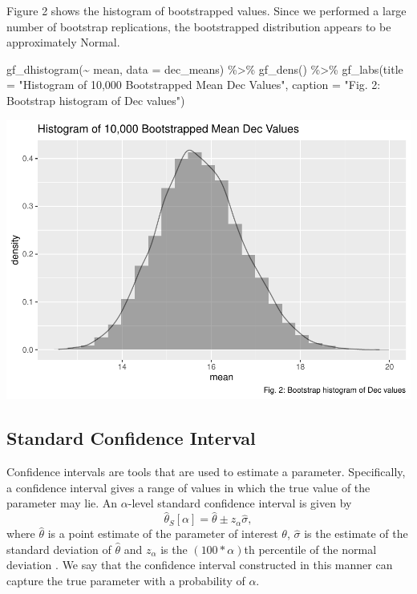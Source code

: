 \documentclass[12pt]{article}
\newenvironment{Shaded}{\begin{snugshade}}{\end{snugshade}}
\newcommand{\AttributeTok}[1]{\textcolor[rgb]{0.77,0.63,0.00}{#1}}
\newcommand{\FunctionTok}[1]{\textcolor[rgb]{0.00,0.00,0.00}{#1}}
\newcommand{\NormalTok}[1]{#1}
\newcommand{\SpecialCharTok}[1]{\textcolor[rgb]{0.00,0.00,0.00}{#1}}
\newcommand{\StringTok}[1]{\textcolor[rgb]{0.31,0.60,0.02}{#1}}
\begin{document}
Figure 2 shows the histogram of bootstrapped values. Since we performed
a large number of bootstrap replications, the bootstrapped distribution
appears to be approximately Normal.

\begin{Shaded}
\begin{Highlighting}[]
\FunctionTok{gf\_dhistogram}\NormalTok{(}\SpecialCharTok{\textasciitilde{}}\NormalTok{ mean, }\AttributeTok{data =}\NormalTok{ dec\_means) }\SpecialCharTok{\%\textgreater{}\%}
  \FunctionTok{gf\_dens}\NormalTok{() }\SpecialCharTok{\%\textgreater{}\%}
  \FunctionTok{gf\_labs}\NormalTok{(}\AttributeTok{title =} \StringTok{"Histogram of 10,000 Bootstrapped Mean Dec Values"}\NormalTok{,}
          \AttributeTok{caption =} \StringTok{"Fig. 2: Bootstrap histogram of Dec values"}\NormalTok{)}
\end{Highlighting}
\end{Shaded}

\includegraphics{paper_files/figure-latex/unnamed-chunk-1-1.pdf}

\hypertarget{standard-confidence-interval}{%
\subsection{Standard Confidence
Interval}\label{standard-confidence-interval}}

Confidence intervals are tools that are used to estimate a parameter.
Specifically, a confidence interval gives a range of values in which the
true value of the parameter may lie. An \(\alpha\)-level standard
confidence interval is given by
\[\hat{\theta}_S[\alpha] = \hat{\theta} \pm z_{\alpha}\hat{\sigma},\]
where \(\hat{\theta}\) is a point estimate of the parameter of interest
\(\theta\), \(\hat{\sigma}\) is the estimate of the standard deviation
of \(\hat{\theta}\) and \(z_{\alpha}\) is the \((100 *\alpha)\)th
percentile of the normal deviation \citep{Efron86}. We say that the
confidence interval constructed in this manner can capture the true
parameter with a probability of \(\alpha\).
\end{document}

